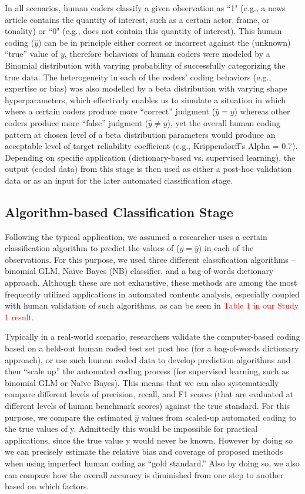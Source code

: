 \documentclass[man, 12pt, a4paper, nolmodern, noextraspace]{apa6}
\begin{document}
    In all scenarios, human coders classify a given observation as ``1" (e.g., a news article contains the quantity of interest, such as a certain actor, frame, or tonality) or ``0" (e.g., does not contain this quantity of interest). This human coding ($\hat{y}$) can be in principle either correct or incorrect against the (unknown) “true” value of $y$, therefore behaviors of human coders were modeled by a Binomial distribution with varying probability of successfully categorizing the true data. The heterogeneity in each of the coders’ coding behaviors (e.g., expertise or bias) was also modelled by a beta distribution with varying shape hyperparameters, which effectively enables us to simulate a situation in which where a certain coders produce more “correct” judgment ($\hat{y} = y$) whereas other coders produce more “false” judgment ($\hat{y} \neq y$), yet the overall human coding pattern at chosen level of a beta distribution parameters would produce an acceptable level of target reliability coefficient (e.g., Krippendorff’s Alpha = 0.7). Depending on specific application (dictionary-based vs. supervised learning), the output (coded data) from this stage is then used as either a post-hoc validation data or as an input for the later automated classification stage. 
    
    \subsection{Algorithm-based Classification Stage}
    
    Following the typical application, we assumed a researcher uses a certain classification algorithm to predict the values of ($y = \hat{y}$) in each of the observations. For this purpose, we used three different classification algorithms – binomial GLM, Naïve Bayes (NB) classifier, and a bag-of-words dictionary approach. Although these are not exhaustive, these methods are among the most frequently utilized applications in automated contents analysis, especially coupled with human validation of such algorithms, as can be seen in \textcolor{red}{Table 1 in our Study 1 result}. 
    
    Typically in a real-world scenario, researchers validate the computer-based coding based on a held-out human coded test set post hoc (for a bag-of-words dictionary approach), or use such human coded data to develop prediction algorithms and then “scale up” the automated coding process (for supervised learning, such as binomial GLM or Naïve Bayes). This means that we can also systematically compare different levels of precision, recall, and F1 scores (that are evaluated at different levels of human benchmark scores) against the true standard. For this purpose, we compare the estimated $\hat{y}$ values from scaled-up automated coding to the true values of y. Admittedly this would be impossible for practical applications, since the true value y would never be known. However by doing so we can precisely estimate the relative bias and coverage of proposed methods when using imperfect human coding as \enquote{gold standard.} Also by doing so, we also can compare how the overall accuracy is diminished from one step to another based on which factors. 
    
\end{document}
